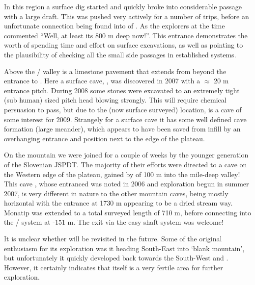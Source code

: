 In this region a surface dig started and quickly broke into considerable
passage with a large draft. This was pushed very actively for a number
of trips, before an unfortunate connection being found into  of . As the explorers at the time commented
``Well, at least its 800 m deep now!''. This  entrance
demonstrates the worth of spending time and effort on surface
excavations, as well as pointing to the plausibility of checking all the
small side passages in established systems.

Above the / valley is a limestone
pavement that extends from beyond the entrance to . Here a
surface cave, , was discovered in 2007 with a $\approx$ 20
m entrance pitch. During 2008 some stones were excavated to an extremely
tight (sub human) sized pitch head blowing strongly. This will require
chemical persuasion to pass, but due to the (now surface surveyed)
location, is a cave of some interest for 2009. Strangely for a surface
cave it has some well defined cave formation (large meander), which
appears to have been saved from infill by an overhanging entrance and
position next to the edge of the plateau.

On the mountain we were joined for a couple of weeks by the younger
generation of the Slovenian JSPDT. The majority of their efforts were
directed to a cave on the Western edge of the plateau, gained by  of 100 m into the mile-deep  valley!
This cave , whose entranced was noted in 2006 and exploration
begun in summer 2007, is very different in nature to the other mountain
caves, being mostly horizontal with the entrance at 1730 m appearing to
be a dried stream way. Monatip was extended to a total surveyed length
of 710 m, before connecting into the  / 
system at -151 m. The exit via the easy  shaft system
was welcome!

It is unclear whether  will be revisited in the future.
Some of the original enthusiasm for its exploration was it heading
South-East into `blank mountain', but unfortunately it quickly developed
back towards the South-West and . However, it certainly
indicates that  itself is a very fertile area for
further exploration.


